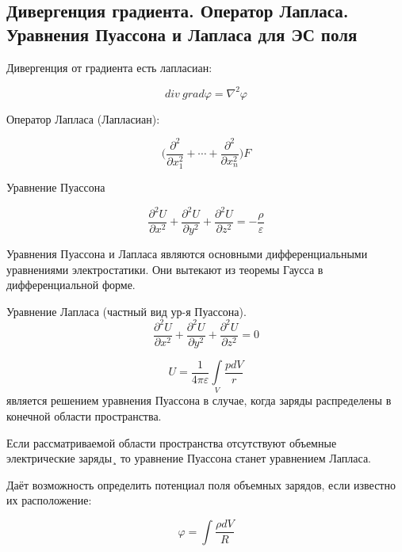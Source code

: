 \subsection{Дивергенция градиента. Оператор Лапласа. Уравнения Пуассона и Лапласа для ЭС поля}

\begin{definition}
    Дивергенция от градиента есть лапласиан:

    $$
    div\ grad\varphi=\nabla^2\varphi
    $$
\end{definition}

Оператор Лапласа (Лапласиан):

$$
\bigg(\frac{\partial^2}{\partial x^2_1}+\cdots+\frac{\partial^2}{\partial x_n^2}\bigg)F
$$

Уравнение Пуассона

$$
\frac{\partial^2 U}{\partial x^2}+\frac{\partial^2 U}{\partial y^2}+\frac{\partial^2 U}{\partial z^2}=-\frac{\rho}{\varepsilon}
$$

Уравнения Пуассона и Лапласа являются основными дифференциальными уравнениями электростатики. Они вытекают из теоремы Гаусса в дифференциальной
форме.
\begin{definition}
    Уравнение Лапласа (частный вид ур-я Пуассона).
    $$
    \frac{\partial^2 U}{\partial x^2}+\frac{\partial^2 U}{\partial y^2}+\frac{\partial^2 U}{\partial z^2}=0
    $$
\end{definition}

$$U = \frac{1}{4 \pi \varepsilon} \int\limits_V \frac{p dV}{r}$$  является решением уравнения Пуассона в случае, когда заряды распределены в конечной области пространства.

Если рассматриваемой области пространства отсутствуют объемные электрические заряды¸ то уравнение Пуассона станет уравнением Лапласа.

Даёт возможность определить потенциал поля объемных зарядов, если известно их расположение:

$$
\varphi=\int\frac{\rho dV}{R}
$$